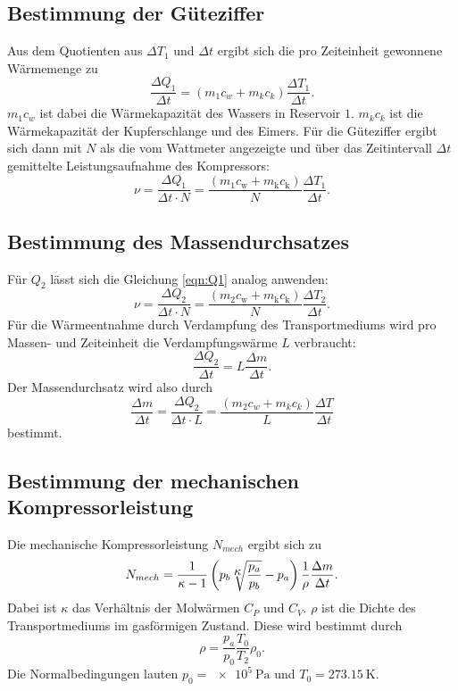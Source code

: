\subsection{Bestimmung der Güteziffer}
Aus dem Quotienten aus $\Delta T_1$ und $\Delta t$ ergibt sich die pro Zeiteinheit 
gewonnene Wärmemenge zu
\begin{equation*}
    \frac{\Delta Q_1}{\Delta t} = (m_1 c_w + m_k c_k)\frac{\Delta T_1}{\Delta t}.
    \label{eqn:Q1}
\end{equation*}
$m_1 c_w$ ist dabei die Wärmekapazität des Wassers in Reservoir $\num{1}$. $m_k c_k$ ist die 
Wärmekapazität der Kupferschlange und des Eimers. Für die Güteziffer ergibt sich dann 
mit $N$ als die vom Wattmeter angezeigte und über das Zeitintervall $\Delta t$ 
gemittelte Leistungsaufnahme des Kompressors:
\begin{equation}
    \nu = \frac{\Delta Q_1}{\Delta t \cdot N} = \frac{(m_1 c_\text{w} + m_\text{k} c_\text{k})}{N} \frac{\Delta T_1}{\Delta t}.
    \label{eqn:güteziffer}
\end{equation}

\subsection{Bestimmung des Massendurchsatzes}
Für $Q_2$ lässt sich die Gleichung \ref{eqn:Q1} analog anwenden:
\begin{equation*}
    \nu = \frac{\Delta Q_2}{\Delta t \cdot N} = \frac{(m_2 c_\text{w} + m_\text{k} c_\text{k})}{N} \frac{\Delta T_2}{\Delta t}.
\end{equation*}
Für die Wärmeentnahme durch Verdampfung des Transportmediums
wird pro Massen- und Zeiteinheit die Verdampfungswärme $L$ 
verbraucht:
\begin{equation*}
    \frac{\Delta Q_2}{\Delta t} = L \frac{\Delta m}{\Delta t}.
\end{equation*}
Der Massendurchsatz wird also durch
\begin{equation}
    \frac{\Delta m}{\Delta t} = \frac{\Delta Q_2}{\Delta t \cdot L} = \frac{(m_2 c_w + m_k c_k)}{L} \frac{\Delta T}{\Delta t} %
    \label{eqn:massendurchsatz}
\end{equation}
bestimmt.

\subsection{Bestimmung der mechanischen Kompressorleistung}
Die mechanische Kompressorleistung $N_{mech}$ ergibt sich zu
\begin{equation}
    N_{mech} = \frac{1}{\kappa - 1} \left(p_b \sqrt[\mathlarger{\mathlarger{\kappa}}]{\frac{p_a}{p_b}} - p_a\right)\frac{1}{\rho}\frac{\Delta m}{\Delta t}. %
    \label{eqn:nmech}
\end{equation}
Dabei ist $\kappa$ das Verhältnis der Molwärmen $C_P$ und $C_V$. $\rho$ ist die Dichte
des Transportmediums im gasförmigen Zustand. Diese wird bestimmt durch
\begin{equation}
    \rho = \frac{p_a}{p_0} \frac{T_0}{T_2} \rho_0.
    \label{eqn:dichte}
\end{equation}
Die Normalbedingungen lauten $p_0 = \SI{e5}{\pascal}$ und $T_0 = \SI{273.15}{\kelvin}$.
